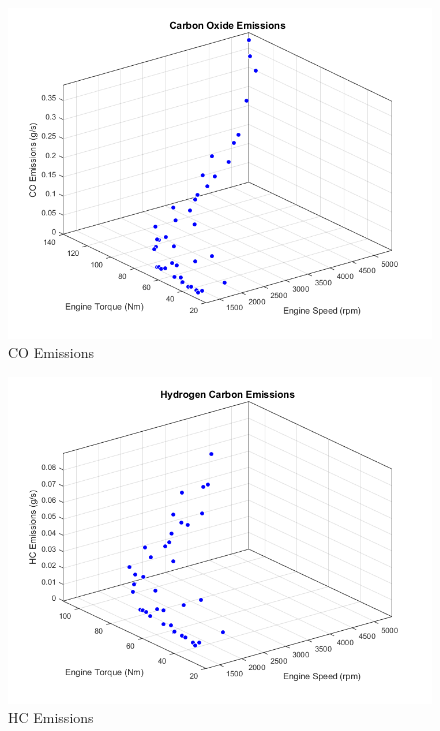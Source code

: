\begin{figure}[h]
\centering
\includegraphics[scale=0.5]{figures/CO}
\caption{CO Emissions}
\label{fig:coFit}
\end{figure}

\begin{figure}[h]
\centering
\includegraphics[scale=0.5]{figures/HC}
\caption{HC Emissions}
\label{fig:hcFit}
\end{figure}

